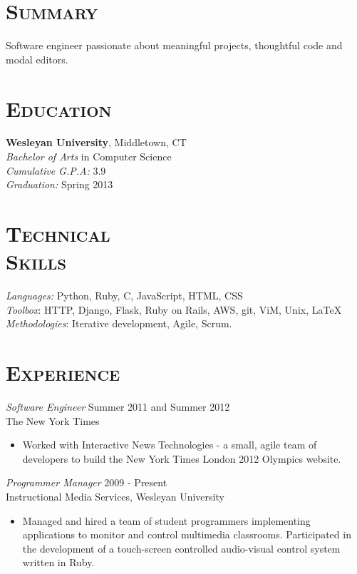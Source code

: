 \documentclass[margin]{res}
\begin{document}
\begin{resume}
\section{\textsc{Summary}} Software engineer passionate about meaningful projects, thoughtful code and modal editors.

\section{\textsc{Education}} {\bf Wesleyan University}, Middletown, CT \\ {\sl Bachelor of Arts} in Computer Science \\
    {\sl Cumulative G.P.A:} 3.9\\
    {\sl Graduation:} Spring 2013
 
 
\section{\textsc{Technical \\ Skills}}
    {\sl Languages:} Python, Ruby, C, JavaScript, HTML, CSS \\
    {\sl Toolbox}: HTTP, Django, Flask, Ruby on Rails, AWS, git, ViM, Unix, \LaTeX \\
    {\sl Methodologies}: Iterative development, Agile, Scrum.

\section{\textsc{Experience}}
    {\sl Software Engineer} \hfill Summer 2011 and Summer 2012 \\
    The New York Times
    \begin{itemize}  \itemsep -2pt %
        \item Worked with Interactive News Technologies - a small, agile team of developers to build the New York Times London 2012 Olympics website.
    \end{itemize}

    {\sl Programmer Manager} \hfill 2009 - Present \\
    Instructional Media Services, Wesleyan University
    \begin{itemize}  \itemsep -2pt %
        \item Managed and hired a team of student programmers implementing applications to monitor and control multimedia classrooms. Participated in the development of a touch-screen controlled audio-visual control system written in Ruby.
    \end{itemize}


\end{resume}
\end{document}
